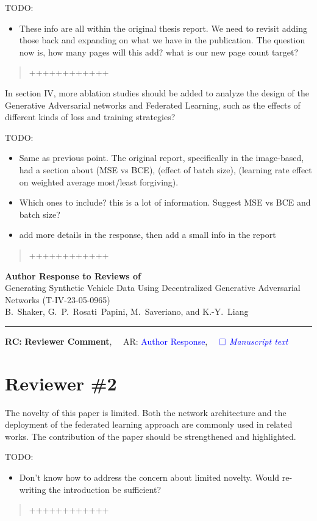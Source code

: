 \documentclass{article}
\def\papertitle{Generating Synthetic Vehicle Data Using Decentralized Generative Adversarial Networks (T-IV-23-05-0965)}
\def\authors{B.~Shaker, G.~P.~Rosati~Papini, M.~Saveriano, and K.-Y.~Liang}
\providecommand{\lettertitle}{Author Response to Reviews of}
\providecommand{\papertitle}{Title}
\providecommand{\authors}{Authors}
\providecommand{\journal}{Journal}
\providecommand{\doi}{--}
\def\headall{
{\Large\bf \lettertitle}\\[1em]
{\Large \papertitle}\\[1em]
{\authors}\\
\hrule

\hfill {\bfseries RC:} \textbf{{Reviewer Comment}},\(\quad\) AR: \textcolor{blue}{Author Response}, \(\quad\textcolor{blue}{\square}\) \emph{\textcolor{blue}{Manuscript text}}}
\begin{document}
\AR TODO: 
\begin{itemize}
    \item These info are all within the original thesis report. We need to revisit adding those back and expanding on what we have in the publication. The question now is, how many pages will this add? what is our new page count target?
\end{itemize}

\begin{quote}
	++++++++++++
\end{quote}

\RC In section IV, more ablation studies should be added to analyze the design of the Generative Adversarial networks and Federated Learning, such as the effects of different kinds of loss and training strategies?

\AR TODO: 
\begin{itemize}
    \item Same as previous point. The original report, specifically in the image-based, had a section about (MSE vs BCE), (effect of batch size), (learning rate effect on weighted average most/least forgiving).
    \item Which ones to include? this is a lot of information. Suggest MSE vs BCE and batch size?
    \item add more details in the response, then add a small info in the report
\end{itemize}

\begin{quote}
	++++++++++++
\end{quote}


\newpage
\headall

\section{Reviewer \#2}

\RC The novelty of this paper is limited. Both the network architecture and the deployment of the federated learning approach are commonly used in related works. The contribution of the paper should be strengthened and highlighted.

\AR TODO: 
\begin{itemize}
    \item Don't know how to address the concern about limited novelty. Would re-writing the introduction be sufficient?
\end{itemize}

\begin{quote}
	++++++++++++
\end{quote}
\end{document}
